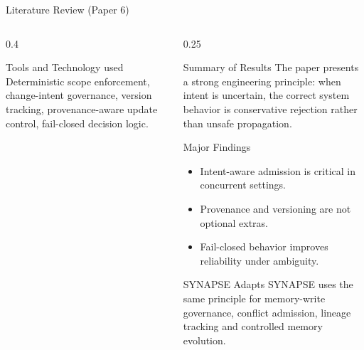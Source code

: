 \begin{frame}{Literature Review (Paper 6)}
\begin{columns}[T]
\begin{column}{0.4\textwidth}
    \begin{block}{Tools and Technology used}
      \tiny Deterministic scope enforcement, change-intent governance, version tracking, provenance-aware update control, fail-closed decision logic.
    \end{block}
  \end{column}

  \begin{column}{0.25\textwidth}
    \begin{block}{Summary of Results}
      \tiny The paper presents a strong engineering principle: when intent is uncertain, the correct system behavior is conservative rejection rather than unsafe propagation.
    \end{block}
    \vspace{0.12cm}
    \begin{block}{Major Findings}
      \tiny
      \begin{itemize}\setlength\itemsep{1pt}
      \item Intent-aware admission is critical in concurrent settings.
\item Provenance and versioning are not optional extras.
\item Fail-closed behavior improves reliability under ambiguity.
      \end{itemize}
    \end{block}
    \begin{alertblock}{SYNAPSE Adapts}
      \tiny SYNAPSE uses the same principle for memory-write governance, conflict admission, lineage tracking and controlled memory evolution.
    \end{alertblock}
  \end{column}
  \end{columns}
\end{frame}
